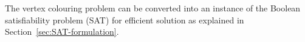 The vertex colouring problem can be converted into an instance of
the Boolean satisfiability problem (SAT) for efficient solution as
explained in Section~\ref{sec:SAT-formulation}.

\begin{figure}[h]
\begin{centering}
\hfill{}\hfill{}\hfill{}
\par\end{centering}


\end{figure}
